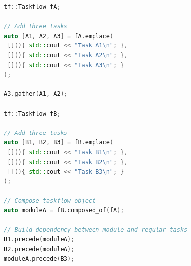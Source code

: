 \documentclass[conference]{IEEEtran}
\begin{document}
\begin{lstlisting}[language=C++,label=taskflow_composition,caption={Cpp-Taskflow v2 taskflow object composition code (19 LOC and 167 tokens).}]
tf::Taskflow fA;

// Add three tasks
auto [A1, A2, A3] = fA.emplace(
 [](){ std::cout << "Task A1\n"; },
 [](){ std::cout << "Task A2\n"; },
 [](){ std::cout << "Task A3\n"; }
);

A3.gather(A1, A2);

tf::Taskflow fB;

// Add three tasks
auto [B1, B2, B3] = fB.emplace(
 [](){ std::cout << "Task B1\n"; },
 [](){ std::cout << "Task B2\n"; },
 [](){ std::cout << "Task B3\n"; }
);

// Compose taskflow object
auto moduleA = fB.composed_of(fA);

// Build dependency between module and regular tasks
B1.precede(moduleA);
B2.precede(moduleA);
moduleA.precede(B3);

\end{lstlisting}

\end{document}

